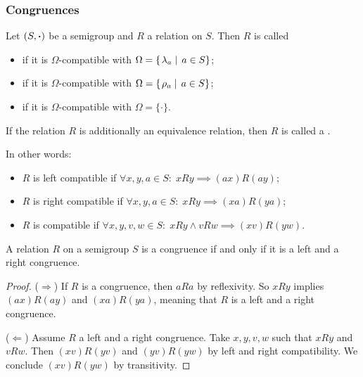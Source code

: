 \subsubsection{Congruences}
\begin{definition}
Let $\left( S,\boldsymbol{\cdot} \right)$ be a semigroup and $R$ a relation on $S$. Then $R$ is called
\begin{itemize}
\item {} if it is $\Omega$-compatible with $\Omega = \left\{\left. \lambda_a \;\right|\; a\in S \right\}$;
\item {} if it is $\Omega$-compatible with $\Omega = \left\{\left. \rho_a \;\right|\; a\in S \right\}$;
\item {} if it is $\Omega$-compatible with $\Omega = \{\boldsymbol{\cdot}\}$.
\end{itemize}
If the relation $R$ is additionally an equivalence relation, then $R$ is called a .
\end{definition}

In other words:
\begin{itemize}
\item $R$ is left compatible if $\forall x,y,a\in S: \; xRy \implies (ax)R(ay)$;
\item $R$ is right compatible if $\forall x,y,a\in S: \; xRy \implies (xa)R(ya)$;
\item $R$ is compatible if $\forall x,y,v,w\in S: \; xRy \land vRw \implies (xv)R(yw)$.
\end{itemize}

\begin{proposition}
A relation $R$ on a semigroup $S$ is a congruence \textup{if and only if} it is a left and a right congruence.
\end{proposition}
\begin{proof}
($\Rightarrow$) If $R$ is a congruence, then $aRa$ by reflexivity. So $xRy$ implies $(ax)R(ay)$ and $(xa)R(ya)$, meaning that $R$ is a left and a right congruence.

($\Leftarrow$) Assume $R$ a left and a right congruence. Take $x,y,v,w$ such that $xRy$ and $vRw$. Then $(xv)R(yv)$ and $(yv)R(yw)$ by left and right compatibility. We conclude $(xv)R(yw)$ by transitivity.
\end{proof}

